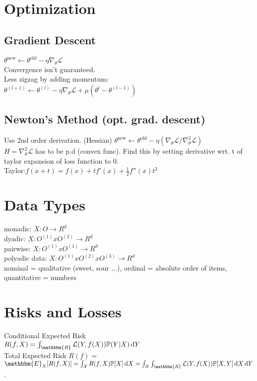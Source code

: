 \section*{Optimization}
\subsection*{Gradient Descent}
$\theta^{\mathrm{new}}\leftarrow\theta^{\mathrm{old}}-\eta\nabla_{\theta}\mathcal{L}$\\
Convergence isn't guaranteed.\\
Less zigzag by adding momentum: \\$\theta^{(l+1)}\leftarrow\theta^{(l)}-\eta\nabla_{\theta}\mathcal{L}+\mu(\theta^{l}-\theta^{(l-1)})$

\subsection*{Newton's Method (opt. grad. descent)}
Use 2nd order derivation. (Hessian)
$\theta^{\mathrm{new}}\leftarrow\theta^{\mathrm{old}}-\eta(\nabla_{\theta}\mathcal{L}/\nabla^2_{\theta}\mathcal{L})$\\
$H=\nabla^2_{\theta}\mathcal{L}$ has to be p.d (convex func).
Find this by setting derivative wrt. t of taylor expansion of loss function to 0. \\
Taylor:$f(x+t)=f(x)+t f'(x)+\frac{1}{2}f''(x)t^2$

\section*{Data Types}
monadic: $X: O \rightarrow R^d$ \\
dyadic: $X: O^{(1)} x O^{(2)} \rightarrow R^d $ \\
pairwise: $X: O^{(1)} x O^{(1)} \rightarrow R^d$ \\
polyadic data: $X: O^{(1)} x O^{(2)} x O^{(3)} \rightarrow R^d $ \\
nominal = qualitative (sweet, sour ...), ordinal = absolute order of items, quantitative = numbers
\section*{Risks and Losses}
Conditional Expected Risk\\
$R(f, X) = \int_{\mathbbm{R}} \mathcal{L}(Y,f(X))\mathbb{P}(Y|X)\di Y$\\
Total Expected Risk
$R(f) =$\\
$\mathbbm{E}_{X}[R(f,X)] =\int_{\mathcal{X}}R(f,X)\mathbb{P}[X]\di X =
\int_{\mathcal{X}}\int_{\mathbbm{R}} \mathcal{L}(Y,f(X))\mathbb{P}[X,Y]\di X\di Y$.


